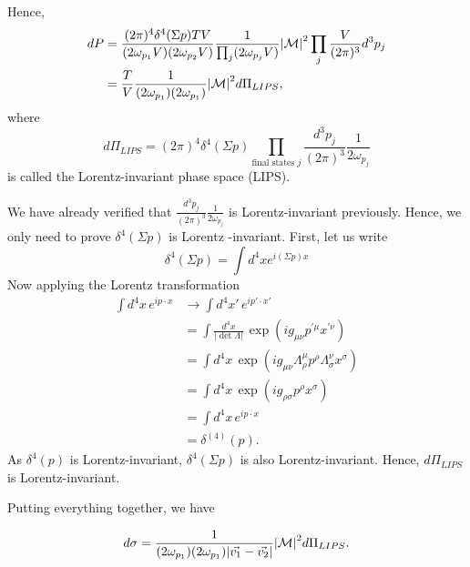 \documentclass[11pt]{article}
\theoremstyle{definition}
\begin{document}
Hence,
\begin{equation}
\begin{aligned}
        dP &= \frac{(2\pi)^4\delta^4(\Sigma p)TV}{(2\omega_{p_1}V)(2\omega_{p_2}V)}\frac{1}{\prod_j(2\omega_{p_j}V)}\abs{\mathcal{M}}^2 \prod_j \frac{V}{(2\pi)^3}d^3p_j\\
        &=\frac{T}{V}\frac{1}{(2\omega_{p_1})(2\omega_{p_1})}\abs{\mathcal{M}}^2d\Pi_{LIPS},
\end{aligned}
\end{equation}
where
\begin{equation}
    d\Pi_{LIPS} = (2\pi)^4\delta^4(\Sigma p)\prod_{\text{final states }j } \frac{d^3p_j}{(2\pi)^3}\frac{1}{2\omega_{p_j}}
\end{equation}
is called the Lorentz-invariant phase space (LIPS).

\begin{tcolorbox}[breakable, colback=yellow!20!white, colframe=black, boxrule=1pt]
We have already verified that $\frac{d^3p_j}{(2\pi)^3}\frac{1}{2\omega_{p_j}}$ is Lorentz-invariant previously. Hence, we only need to prove $\delta^4(\Sigma p)$ is Lorentz -invariant. First, let us write 
\begin{equation}
    \delta^4(\Sigma p) = \int d^4x e^{i(\Sigma p)x}
\end{equation}
Now applying the Lorentz transformation
\begin{align*}
\int d^4x\, e^{ip\cdot x} &\rightarrow \int d^4x'\, e^{ip'\cdot x'} \\
&= \int \frac{d^4x}{|\det\Lambda|}\, \exp\left(ig_{\mu\nu}p^{\prime\mu}x^{\prime\nu}\right) \\
&= \int d^4x\, \exp\left(ig_{\mu\nu}\Lambda^\mu_\rho p^\rho \Lambda^\nu_\sigma x^\sigma\right) \\
&= \int d^4x\, \exp\left(ig_{\rho\sigma}p^\rho x^\sigma\right) \\
&= \int d^4x\, e^{ip\cdot x} \\
&= \delta^{(4)}(p).
\end{align*}
As $\delta^4(p)$ is Lorentz-invariant, $\delta^4(\Sigma p)$ is also Lorentz-invariant. Hence, $d\Pi_{LIPS}$ is Lorentz-invariant.

\end{tcolorbox}

Putting everything together, we have
\begin{shaded}
    \begin{equation}
        d\sigma = \frac{1}{(2\omega_{p_1})(2\omega_{p_1})\abs{\vec{v_1} - \vec{v_2}}}\abs{\mathcal{M}}^2d\Pi_{LIPS}.
        \label{Eq. Genaral Scattering}
    \end{equation}
\end{shaded}
\end{document}
